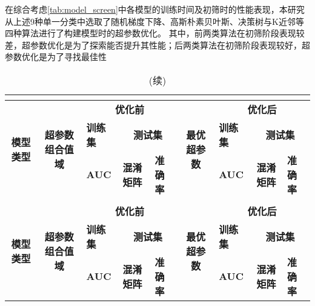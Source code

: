 在综合考虑\autoref{tab:model_screen}中各模型的训练时间及初筛时的性能表现，本研究从上述9种单一分类中选取了随机梯度下降、高斯朴素贝叶斯、决策树与K近邻等四种算法进行了构建模型时的超参数优化。
其中，前两类算法在初筛阶段表现较差，超参数优化是为了探索能否提升其性能；后两类算法在初筛阶段表现较好，超参数优化是为了寻找最佳性
\begin{landscape}
      \begin{longtable}{m{3cm}<{\centering}m{5cm}<{\centering}m{1cm}<{\centering}m{2cm}<{\centering}m{1cm}<{\centering}m{3cm}<{\centering}m{1cm}<{\centering}m{2cm}<{\centering}m{1cm}<{\centering}}
            \caption{超参数优化前后模型性能对比}\\
            \label{tab:super_para}\\
            \toprule
            \multicolumn{1}{c}{\multirow{3}{*}{\textbf{模型类型}}} & \multicolumn{1}{c}{\multirow{3}{*}{\textbf{超参数组合值域}}}    & \multicolumn{3}{c}{\textbf{优化前}}   & \multicolumn{1}{c}{\multirow{3}{*}{\textbf{最优超参数}}}   & \multicolumn{3}{c}{\textbf{优化后}} \\
            \multicolumn{1}{c}{} & \multicolumn{1}{c}{}     & \textbf{训练集} & \multicolumn{2}{c}{\textbf{测试集}} & \multicolumn{1}{c}{}   & \textbf{训练集} & \multicolumn{2}{c}{\textbf{测试集}}     \\
            \multicolumn{1}{c}{} & \multicolumn{1}{c}{}     & \textbf{AUC} & \textbf{混淆矩阵}    & \textbf{准确率} & \multicolumn{1}{c}{}    & \textbf{AUC} & \multicolumn{1}{c}{\textbf{混淆矩阵}}     & \textbf{准确率} \\
            \midrule
            \endfirsthead
            \caption[]{(续)}\\
            \midrule
            \multicolumn{1}{c}{\multirow{3}{*}{\textbf{模型类型}}} & \multicolumn{1}{c}{\multirow{3}{*}{\textbf{超参数组合值域}}}    & \multicolumn{3}{c}{\textbf{优化前}}   & \multicolumn{1}{c}{\multirow{3}{*}{\textbf{最优超参数}}}   & \multicolumn{3}{c}{\textbf{优化后}} \\
            \multicolumn{1}{c}{} & \multicolumn{1}{c}{}     & \textbf{训练集} & \multicolumn{2}{c}{\textbf{测试集}} & \multicolumn{1}{c}{}   & \textbf{训练集} & \multicolumn{2}{c}{\textbf{测试集}}     \\
            \multicolumn{1}{c}{} & \multicolumn{1}{c}{}     & \textbf{AUC} & \textbf{混淆矩阵}    & \textbf{准确率} & \multicolumn{1}{c}{}    & \textbf{AUC} & \multicolumn{1}{c}{\textbf{混淆矩阵}}     & \textbf{准确率} \\

\end{longtable}
\end{landscape}
